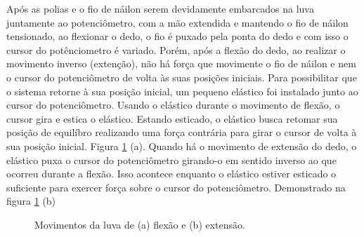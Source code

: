\documentclass[
	12pt,				%
	openright,			%
	oneside,			%
	a4paper,			%
	english,			%
	brazil				%
	]{abntex2}
\begin{document}



		Após as polias e o fio de náilon serem devidamente embarcados na luva juntamente ao potenciômetro, com a mão extendida e mantendo o fio de náilon tensionado, ao flexionar o dedo, o fio é puxado pela ponta do dedo e com isso o cursor do potênciometro é variado. Porém, após a flexão do dedo, ao realizar o movimento inverso (extenção), não há força que movimente o fio de náilon e nem o cursor do potenciômetro de volta às suas posições iniciais.
		Para possibilitar que o sistema retorne à sua posição inicial, um pequeno elástico foi instalado junto ao cursor do potenciômetro. Usando o elástico durante o movimento de flexão, o cursor gira e estica o elástico. Estando esticado, o elástico busca retomar sua posição de equilíbro realizando uma força contrária para girar o cursor de volta à sua posição inicial. Figura \ref{Fig:glove-flex-and-extend2} (a).		
		Quando há o movimento de extensão do dedo, o elástico puxa o cursor do potenciômetro girando-o em sentido inverso ao que ocorreu durante a flexão. Isso acontece enquanto o elástico estiver esticado o suficiente para exercer força sobre o cursor do potenciômetro. Demonstrado na figura \ref{Fig:glove-flex-and-extend2} (b)
		

	\begin{figure}[!htb]
		 \centering
		 \caption{ Movimentos da luva de (a) flexão e (b) extensão.} 
		 \centering
		 \label{Fig:glove-flex-and-extend2}
	\end{figure}
\end{document}
